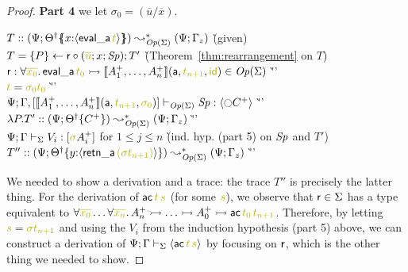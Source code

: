 \begin{proof}
\noindent
{\bf Part 4}
we let $\sigma_0 = (\overline{u}/\overline{x})$. 
\begin{tabbing}
$T :: (\Psi; \frameoff{\opsubst{\Theta}}{x{:}\susp{{\sf eval\_a}\,\lf{t}}}) 
       \leadsto^*_{\transop{\Sigma}} 
      (\Psi; \Gamma_z)$
 \` (given)
\\
$T = \tstep{P}{\sf r}{(\lf{\overline{u}}; x; \Sp)}; T'$
 \` (Theorem~\ref{thm:rearrangement} on $T$)
\\
\qquad ${\sf r} : \forall \lf{\overline{x_0}}.\, {\sf eval\_a}\,\lf{t_0} \lefti 
   \opbasic{A^+_1, \ldots, A^+_n}{t_{n+1}}{\sf id} \in \transop{\Sigma}$ 
 \` ''\qquad\qquad~
\\
\qquad $\lf{t} = \lf{{\sigma_0}t_0}$ 
 \` ''\qquad\qquad~
\\
\qquad $\slst{\transop{\Sigma}}{\Psi}{\Gamma,[\opbasic{A_1^+,\ldots,A_n^+}{t_{n+1}}{\sigma_0}]}{\Sp}{\susp{{\ocircle} C^+}}$ 
 \` ''\qquad\qquad~
\\
\qquad $\lambda P.T' :: (\Psi; {{{\Theta}^\dag}}\{{C^+}\})
         \leadsto^*_{{\it Op}({\Sigma})}
       (\Psi; \Gamma_z)$ 
 \` ''\qquad\qquad~
\\
$\slst{\Sigma}{\Psi}{\Gamma}{V_i}{[\lf{\sigma}{A^+_i}]}$ for $1 \leq j \leq n$
\` (ind. hyp. (part 5) on ${\it Sp}$ and $T'$)
\\
$T'' :: (\Psi; \tackon{\opsubst{\Theta}}
                 {y{:}\susp{{\sf retn\_a}\,\lf{({\sigma}t_{n+1})}}})
         \leadsto^*_{\transop{\Sigma}}
        (\Psi; \Gamma_z)$
 \` ''\qquad\qquad~
\end{tabbing}

\noindent
We needed to show a derivation and a trace: the trace $T''$ is
precisely the latter thing. For the derivation of ${\sf
  ac}\,\lf{t}\,\lf{s}$ (for some $\lf{s}$), we observe that ${\sf r}
\in \Sigma$ has a type equivalent to $\forall
\lf{\overline{x_0}}\ldots \forall \lf{\overline{x_n}}.\, A^+_n \lefti
\ldots \lefti A^+_0 \lefti {\sf ac}\,\lf{t_0}\,\lf{t_{n+1}}$.
Therefore, by letting $\lf{s} = \lf{{\sigma}t_{n+1}}$ and using the
$V_i$ from the induction hypothesis (part 5) above, we can construct a
derivation of $\slss{\Sigma}{\Psi}{\Gamma}{\susp{{\sf
      ac}\,\lf{t}\,\lf{s}}}$ by focusing on ${\sf r}$, which is the
other thing we needed to show.


\end{proof}
